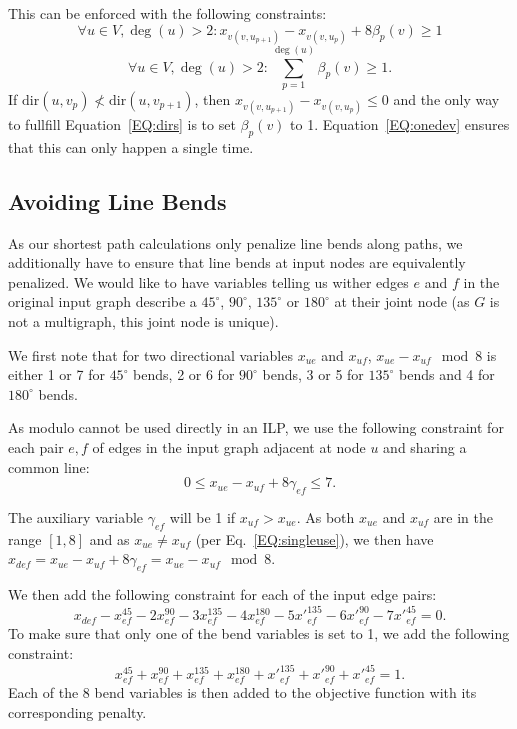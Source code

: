 \documentclass{sig-alternate-sigmod09}
\begin{document}
This can be enforced with the following constraints:
%
\begin{equation}
  \forall u \in V, \deg(u) > 2: x_{v(v, u_{p + 1})} - x_{v(v, u_{p})} + 8\beta_p(v) \geq 1\label{EQ:dirs}
\end{equation}
\begin{equation} 
  \forall u \in V, \deg(u) > 2: \sum_{p = 1}^{\deg(u)} \beta_p(v) \geq 1\label{EQ:onedev}.
\end{equation}
%
If $\text{dir}(u, v_p) \not< \text{dir}(u, v_{p + 1})$, then $x_{v(v, u_{p + 1})} - x_{v(v, u_{p})} \leq 0$ and the only way to fullfill Equation~\ref{EQ:dirs} is to set $\beta_p(v)$ to 1.
Equation~\ref{EQ:onedev} ensures that this can only happen a single time.

\subsection{Avoiding Line Bends}

As our shortest path calculations only penalize line bends along paths, we additionally have to ensure that line bends at input nodes are equivalently penalized.
We would like to have variables telling us wither edges $e$ and $f$ in the original input graph describe a $45^{\circ}$, $90^{\circ}$, $135^{\circ}$ or $180^{\circ}$ at their joint node (as $G$ is not a multigraph, this joint node is unique).

We first note that for two directional variables $x_{ue}$ and $x_{uf}$, $x_{ue} - x_{uf} \mod 8$ is either 1 or 7 for $45^\circ$ bends, 2 or 6 for $90^\circ$ bends, 3 or 5 for $135^\circ$ bends and 4 for $180^\circ$ bends.

As modulo cannot be used directly in an ILP, we use the following constraint for each pair $e, f$ of edges in the input graph adjacent at node $u$ and sharing a common line:
\begin{equation} 
  0 \leq x_{ue} - x_{uf} + 8 \gamma_{ef} \leq 7.
\end{equation}

The auxiliary variable $\gamma_{ef}$ will be 1 if $x_{uf} > x_{ue}$. As both $x_{ue}$ and $x_{uf}$ are in the range $[1, 8]$ and as $x_{ue} \neq x_{uf}$ (per Eq.~\ref{EQ:singleuse}), we then have $x_{def} = x_{ue} - x_{uf} + 8 \gamma_{ef} = x_{ue} - x_{uf} \mod 8$.

We then add the following constraint for each of the input edge pairs:
%
\begin{equation} 
  x_{def} - x_{ef}^{45} - 2x_{ef}^{90} - 3x_{ef}^{135} - 4x_{ef}^{180} - 5 {x'}_{ef}^{135} - 6{x'}_{ef}^{90} - 7{x'}_{ef}^{45} = 0.
\end{equation}
%
To make sure that only one of the bend variables is set to 1, we add the following constraint:
%
\begin{equation} 
  x_{ef}^{45} + x_{ef}^{90} + x_{ef}^{135} + x_{ef}^{180} + {x'}_{ef}^{135} + {x'}_{ef}^{90} + {x'}_{ef}^{45} = 1.
\end{equation}
%
Each of the 8 bend variables is then added to the objective function with its corresponding penalty.
\end{document}
